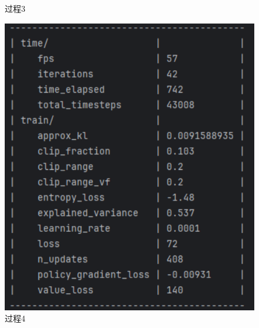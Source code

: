 \begin{figure}[H]
\begin{minipage}{0.24\textwidth}
	   \caption*{过程3}
    \end{minipage}%
    \begin{minipage}{0.25\textwidth}
        \centering
        \includegraphics[width=\textwidth]{images/training4.pdf}
	   \caption*{过程4}
    \end{minipage}
    
    \vspace{0.5cm}  
    

\end{figure}
